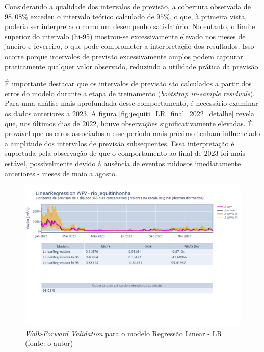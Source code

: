 Considerando a qualidade dos intervalos de previsão, a cobertura observada de $98,08\%$ excedeu o intervalo teórico calculado de $95\%$, o que, à primeira vista, poderia ser interpretado como um desempenho satisfatório. No entanto, o limite superior do intervalo (hi-95) mostrou-se excessivamente elevado nos meses de janeiro e fevereiro, o que pode comprometer a interpretação dos resultados. Isso ocorre porque intervalos de previsão excessivamente amplos podem capturar praticamente qualquer valor observado, reduzindo a utilidade prática da previsão.

É importante destacar que os intervalos de previsão são calculados a partir dos erros do modelo durante a etapa de treinamento (\textit{bootstrap in-sample residuals}). Para uma análise mais aprofundada desse comportamento, é necessário examinar os dados anteriores a $2023$. A figura \ref{fig:jequiti_LR_final_2022_detalhe} revela que, nos últimos dias de $2022$, houve observações significativamente elevadas. É provável que os erros associados a esse período mais próximo tenham influenciado a amplitude dos intervalos de previsão subsequentes. Essa interpretação é suportada pela observação de que o comportamento ao final de $2023$ foi mais estável, possivelmente devido à ausência de eventos ruidosos imediatamente anteriores - meses de maio a agosto.

\begin{figure}[!h]
	\centering
	\includegraphics[scale=0.33]{Figuras/jequiti/wfv/LR/LR_WFV_LOG.png}
	\caption{\textit{Walk-Forward Validation} para o modelo Regressão Linear - LR\\(fonte: o autor)}
	\label{fig:jequiti_LR_WFV_LOG}
\end{figure}

